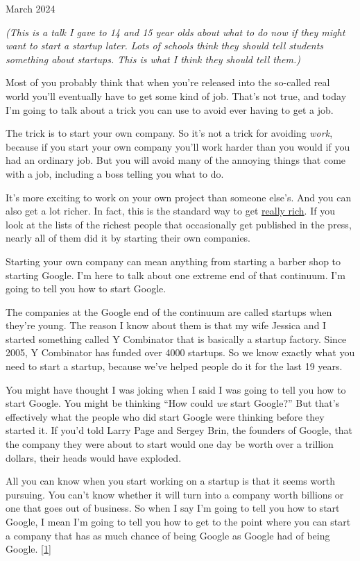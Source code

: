 March 2024

\emph{(This is a talk I gave to 14 and 15 year olds about what to do now
if they might want to start a startup later. Lots of schools think they
should tell students something about startups. This is what I think they
should tell them.)}

Most of you probably think that when you're released into the so-called
real world you'll eventually have to get some kind of job. That's not
true, and today I'm going to talk about a trick you can use to avoid
ever having to get a job.

The trick is to start your own company. So it's not a trick for avoiding
\emph{work}, because if you start your own company you'll work harder
than you would if you had an ordinary job. But you will avoid many of
the annoying things that come with a job, including a boss telling you
what to do.

It's more exciting to work on your own project than someone else's. And
you can also get a lot richer. In fact, this is the standard way to get
\href{richnow.html}{really rich}. If you look at the lists of the
richest people that occasionally get published in the press, nearly all
of them did it by starting their own companies.

Starting your own company can mean anything from starting a barber shop
to starting Google. I'm here to talk about one extreme end of that
continuum. I'm going to tell you how to start Google.

The companies at the Google end of the continuum are called startups
when they're young. The reason I know about them is that my wife Jessica
and I started something called Y Combinator that is basically a startup
factory. Since 2005, Y Combinator has funded over 4000 startups. So we
know exactly what you need to start a startup, because we've helped
people do it for the last 19 years.

You might have thought I was joking when I said I was going to tell you
how to start Google. You might be thinking ``How could \emph{we} start
Google?'' But that's effectively what the people who did start Google
were thinking before they started it. If you'd told Larry Page and
Sergey Brin, the founders of Google, that the company they were about to
start would one day be worth over a trillion dollars, their heads would
have exploded.

All you can know when you start working on a startup is that it seems
worth pursuing. You can't know whether it will turn into a company worth
billions or one that goes out of business. So when I say I'm going to
tell you how to start Google, I mean I'm going to tell you how to get to
the point where you can start a company that has as much chance of being
Google as Google had of being Google. {[}\hyperref[f1n]{1}{]}

